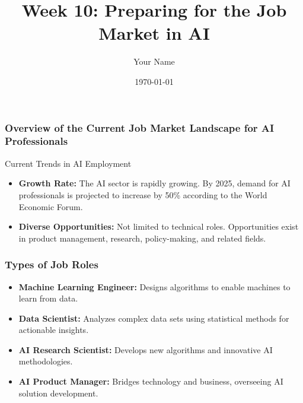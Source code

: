 \documentclass{beamer}
\title{Week 10: Preparing for the Job Market in AI}
\author{Your Name}
\institute{Your Institution}
\date{\today}
\begin{document}
\frame{\titlepage}

\begin{frame}[fragile]
    \titlepage
\end{frame}

\begin{frame}[fragile]
    \frametitle{Overview of the Current Job Market Landscape for AI Professionals}
    
    \begin{block}{Current Trends in AI Employment}
        \begin{itemize}
            \item \textbf{Growth Rate:} 
                The AI sector is rapidly growing. By 2025, demand for AI professionals is projected to increase by 50\% according to the World Economic Forum.
                
            \item \textbf{Diverse Opportunities:} 
                Not limited to technical roles. Opportunities exist in product management, research, policy-making, and related fields.
        \end{itemize}
    \end{block}
\end{frame}

\begin{frame}[fragile]
    \frametitle{Types of Job Roles}
    
    \begin{itemize}
        \item \textbf{Machine Learning Engineer:} 
            Designs algorithms to enable machines to learn from data.
            
        \item \textbf{Data Scientist:} 
            Analyzes complex data sets using statistical methods for actionable insights.
            
        \item \textbf{AI Research Scientist:} 
            Develops new algorithms and innovative AI methodologies.
            
        \item \textbf{AI Product Manager:} 
            Bridges technology and business, overseeing AI solution development.
    \end{itemize}
\end{frame}
\end{document}
